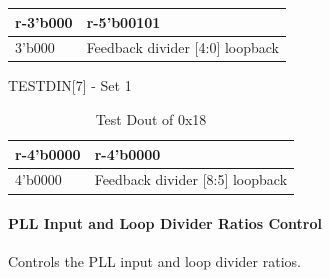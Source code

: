 \documentclass[main\_\_EN.tex]{subfiles}
\begin{document}
\begin{itemize}
\begin{longtable}{ |p{4cm}|p{8cm}|}
            \hline
            \rowcolor{lightgray}
            \textbf{r-3'b000} & \textbf{r-5'b00101} \\ \hline
            3'b000 & Feedback divider [4:0] loopback \\ \hline
        \end{longtable}
        TESTDIN[7] - Set 1
        \begin{longtable}{ |p{4cm}|p{8cm}|}
            \caption{Test Dout of 0x18}
            \label{tab:test-dout-0x18-set1} \\
            \hline
            \rowcolor{lightgray}
            \textbf{r-4'b0000} & \textbf{r-4'b0000} \\ \hline
            4'b0000 & Feedback divider [8:5] loopback \\ \hline
        \end{longtable}
\end{itemize}

\paragraph{PLL Input and Loop Divider Ratios Control}
\label{sec:test-code-0x19}
Controls the PLL input and loop divider ratios.
\end{document}

